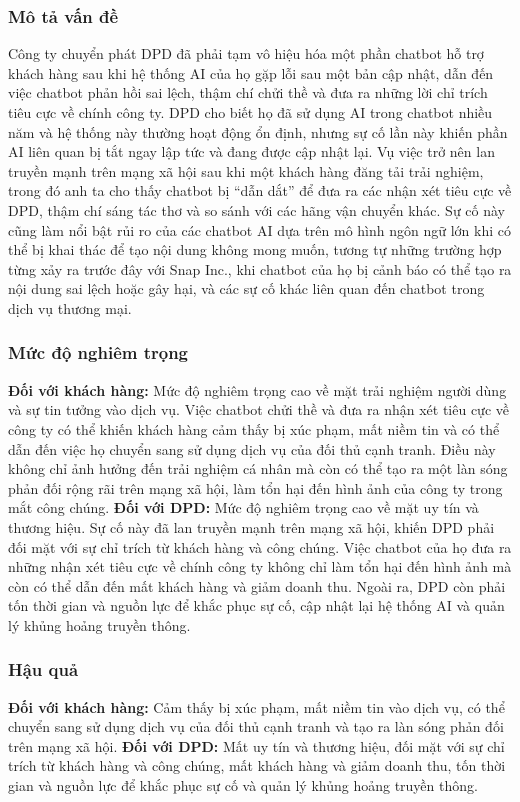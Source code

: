 \subsubsection{Mô tả vấn đề}
Công ty chuyển phát DPD đã phải tạm vô hiệu hóa một phần chatbot hỗ trợ khách hàng sau khi hệ thống AI của họ gặp lỗi sau một bản cập nhật, dẫn đến việc chatbot phản hồi sai lệch, thậm chí chửi thề và đưa ra những lời chỉ trích tiêu cực về chính công ty. DPD cho biết họ đã sử dụng AI trong chatbot nhiều năm và hệ thống này thường hoạt động ổn định, nhưng sự cố lần này khiến phần AI liên quan bị tắt ngay lập tức và đang được cập nhật lại. Vụ việc trở nên lan truyền mạnh trên mạng xã hội sau khi một khách hàng đăng tải trải nghiệm, trong đó anh ta cho thấy chatbot bị “dẫn dắt” để đưa ra các nhận xét tiêu cực về DPD, thậm chí sáng tác thơ và so sánh với các hãng vận chuyển khác. Sự cố này cũng làm nổi bật rủi ro của các chatbot AI dựa trên mô hình ngôn ngữ lớn khi có thể bị khai thác để tạo nội dung không mong muốn, tương tự những trường hợp từng xảy ra trước đây với Snap Inc., khi chatbot của họ bị cảnh báo có thể tạo ra nội dung sai lệch hoặc gây hại, và các sự cố khác liên quan đến chatbot trong dịch vụ thương mại.

\subsubsection{Mức độ nghiêm trọng}
\textbf{Đối với khách hàng:} Mức độ nghiêm trọng cao về mặt trải nghiệm người dùng và sự tin tưởng vào dịch vụ. Việc chatbot chửi thề và đưa ra nhận xét tiêu cực về công ty có thể khiến khách hàng cảm thấy bị xúc phạm, mất niềm tin và có thể dẫn đến việc họ chuyển sang sử dụng dịch vụ của đối thủ cạnh tranh. Điều này không chỉ ảnh hưởng đến trải nghiệm cá nhân mà còn có thể tạo ra một làn sóng phản đối rộng rãi trên mạng xã hội, làm tổn hại đến hình ảnh của công ty trong mắt công chúng.
\textbf{Đối với DPD:} Mức độ nghiêm trọng cao về mặt uy tín và thương hiệu. Sự cố này đã lan truyền mạnh trên mạng xã hội, khiến DPD phải đối mặt với sự chỉ trích từ khách hàng và công chúng. Việc chatbot của họ đưa ra những nhận xét tiêu cực về chính công ty không chỉ làm tổn hại đến hình ảnh mà còn có thể dẫn đến mất khách hàng và giảm doanh thu. Ngoài ra, DPD còn phải tốn thời gian và nguồn lực để khắc phục sự cố, cập nhật lại hệ thống AI và quản lý khủng hoảng truyền thông.

\subsubsection{Hậu quả}
\textbf{Đối với khách hàng:} Cảm thấy bị xúc phạm, mất niềm tin vào dịch vụ, có thể chuyển sang sử dụng dịch vụ của đối thủ cạnh tranh và tạo ra làn sóng phản đối trên mạng xã hội.
\textbf{Đối với DPD:} Mất uy tín và thương hiệu, đối mặt với sự chỉ trích từ khách hàng và công chúng, mất khách hàng và giảm doanh thu, tốn thời gian và nguồn lực để khắc phục sự cố và quản lý khủng hoảng truyền thông.

